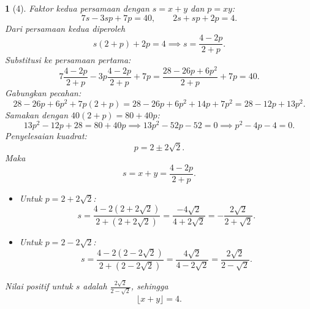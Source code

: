 \documentclass[11pt,a4paper,DIV=12]{scrartcl}
\theoremstyle{problemstyle}
\theoremstyle{answerstyle}
\newtheorem{answer}{}
\begin{document}
\begin{answer}[4]

  Faktor kedua persamaan dengan $s=x+y$ dan $p=xy$:
  \[
    7s - 3 s p + 7 p = 40, \qquad 2 s + s p + 2 p = 4.
  \]
  Dari persamaan kedua diperoleh
  \[
    s (2+p) + 2p = 4 \implies s = \frac{4 - 2p}{2 + p}.
  \]
  Substitusi ke persamaan pertama:
  \[
    7 \frac{4 - 2p}{2 + p} - 3p \frac{4 - 2p}{2 + p} + 7p = \frac{28 - 26p + 6 p^2}{2 + p} + 7p = 40.
  \]
  Gabungkan pecahan:
  \[
    28 - 26p + 6p^2 + 7p(2+p) = 28 - 26p + 6p^2 + 14p + 7p^2 = 28 - 12p + 13p^2.
  \]
  Samakan dengan $40(2+p) = 80 + 40p$:
  \[
    13p^2 - 12p + 28 = 80 + 40p \implies 13p^2 - 52p - 52 = 0 \implies p^2 - 4p -4 = 0.
  \]
  Penyelesaian kuadrat:
  \[
    p = 2 \pm 2 \sqrt{2}.
  \]
  Maka
  \[
    s = x+y = \frac{4 - 2p}{2 + p}.
  \]
  \begin{itemize}
    \item Untuk $p = 2 + 2\sqrt{2}$:
          \[
            s = \frac{4 - 2(2 + 2\sqrt{2})}{2 + (2 + 2\sqrt{2})} = \frac{-4\sqrt{2}}{4 + 2 \sqrt{2}} = - \frac{2 \sqrt{2}}{2 + \sqrt{2}}.
          \]
    \item Untuk $p = 2 - 2\sqrt{2}$:
          \[
            s = \frac{4 - 2(2 - 2\sqrt{2})}{2 + (2 - 2\sqrt{2})} = \frac{4\sqrt{2}}{4 - 2 \sqrt{2}} = \frac{2 \sqrt{2}}{2 - \sqrt{2}}.
          \]
  \end{itemize}
  Nilai positif untuk $s$ adalah $\frac{2 \sqrt{2}}{2 - \sqrt{2}}$, sehingga
  \[
    \lfloor x+y \rfloor = \boxed{4}.
  \]
\end{answer}
\end{document}
